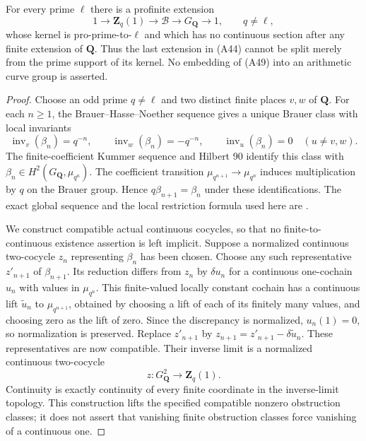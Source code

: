 \begin{proposition}
\label{A:prime-complement-counterexample}
For every prime $\ell$ there is a profinite extension
\[
 1\longrightarrow\mathbf Z_q(1)\longrightarrow
 \mathcal B\longrightarrow G_{\mathbf Q}
       \longrightarrow1,
       \qquad q\ne\ell,
                                                        \tag{A49}
\]
whose kernel is pro-prime-to-$\ell$ and which has
no continuous section after any finite extension
of $\mathbf Q$. Thus the last extension in (A44)
cannot be split merely from the prime support
of its kernel. No embedding of (A49) into an
arithmetic curve group is asserted.
\end{proposition}
\begin{proof}
Choose an odd prime $q\ne\ell$ and two distinct
finite places $v,w$ of $\mathbf Q$.
For each $n\ge1$, the Brauer--Hasse--Noether
sequence gives a unique Brauer class with local
invariants
\[
 \operatorname{inv}_v(\beta_n)=q^{-n},\qquad
 \operatorname{inv}_w(\beta_n)=-q^{-n},\qquad
 \operatorname{inv}_u(\beta_n)=0\quad(u\ne v,w).
                                                        \tag{A50}
\]
The finite-coefficient Kummer sequence and Hilbert
90 identify this class with
$\beta_n\in H^2(G_{\mathbf Q},\mu_{q^n})$.
The coefficient transition
$\mu_{q^{n+1}}\to\mu_{q^n}$ induces multiplication
by $q$ on the Brauer group. Hence
$q\beta_{n+1}=\beta_n$ under these identifications.
The exact global sequence and the local
restriction formula used here are
\cite[IV, 2.14(e); III, (29)]{A_MilneCFT}.

We construct compatible actual continuous
cocycles, so that no finite-to-continuous
existence assertion is left implicit.
Suppose a normalized continuous two-cocycle
$z_n$ representing $\beta_n$ has been chosen.
Choose any such representative $z'_{n+1}$
of $\beta_{n+1}$. Its reduction differs from
$z_n$ by $\delta u_n$ for a continuous
one-cochain $u_n$ with values in $\mu_{q^n}$.
This finite-valued locally constant cochain
has a continuous lift $\widetilde u_n$ to
$\mu_{q^{n+1}}$, obtained by choosing a lift
of each of its finitely many values, and choosing
zero as the lift of zero. Since the discrepancy
is normalized, $u_n(1)=0$, so normalization
is preserved.
Replace $z'_{n+1}$ by
$z_{n+1}=z'_{n+1}-\delta\widetilde u_n$.
These representatives are now compatible.
Their inverse limit is a normalized continuous
two-cocycle
\[
 z:G_{\mathbf Q}^2\longrightarrow\mathbf Z_q(1).
\]
Continuity is exactly continuity of every
finite coordinate in the inverse-limit
topology. This construction lifts the specified
compatible nonzero obstruction classes; it does
not assert that vanishing finite obstruction
classes force vanishing of a continuous one.


\end{proof}
